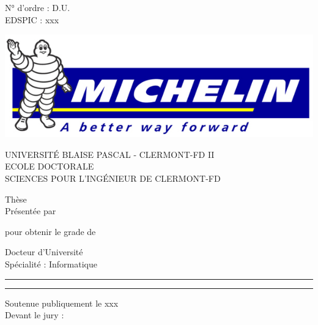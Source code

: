 %
\begin{titlepage}

    \begin{minipage}{0.3\textwidth}
        N° d'ordre : D.U.\\
        EDSPIC : xxx
    \end{minipage}
    \hfill
    \begin{minipage}{0.3\textwidth}
        \includegraphics[width=1.0\linewidth]{figures/michelin.jpg}
    \end{minipage}

	\center
    {\Large\uppercase{Universit\'e Blaise Pascal - Clermont-Fd II\\Ecole Doctorale\\Sciences pour l'Ing\'enieur de Clermont-Fd}\par}

    \hfill

    {\huge Thèse}\\
    Présentée par\\
    {\huge\thesisName\par}

    pour obtenir le grade de

    {\LARGE Docteur d'Université}\\
    Spécialité : Informatique\par

    \rule[5pt]{\textwidth}{.4pt}
    {\LARGE\thesisTitle \par}
    \rule[5pt]{\textwidth}{.4pt}\par

    \flushleft
    Soutenue publiquement le xxx\\
    Devant le jury :


\end{titlepage}
